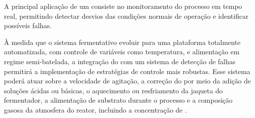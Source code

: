 	A principal aplicação de um \getbuffer[sens] consiste no monitoramento do processo em tempo real, permitindo detectar desvios das condições normais de operação e identificar possíveis falhas.

	À medida que o sistema fermentativo evoluir para uma plataforma totalmente automatizada, com controle de variáveis como temperatura,  e alimentação em regime semi-batelada, a integração do \getbuffer[sens] com um sistema de detecção de falhas permitirá a implementação de estratégias de controle mais robustas. Esse sistema poderá atuar sobre a velocidade de agitação, a correção do  por meio da adição de soluções ácidas ou básicas, o aquecimento ou resfriamento da jaqueta do fermentador, a alimentação de substrato durante o processo e a composição gasosa da atmosfera do reator, incluindo a concentração de .
\stopsection

